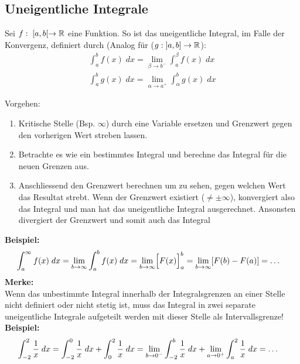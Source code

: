 \subsection{Uneigentliche Integrale}
\begin{definition} Sei $f: \; [a, b[ \to \mathbb{R}$ eine Funktion. So ist das uneigentliche Integral, im Falle der Konvergenz, definiert durch (Analog für ($g: \; ]a, b] \to \mathbb{R}$):\\
\begin{align*}
	\int_a^b f(x) \; dx = \lim_{\beta \to b^-} \int_a^{\beta} f(x)\; dx\\
	\int_a^b g(x) \; dx = \lim_{\alpha \to a^+} \int_{\alpha}^{b} g(x)\; dx
\end{align*}
\end{definition}

Vorgehen:
\begin{enumerate}
	\item Kritische Stelle (Bsp. $\infty$) durch eine Variable ersetzen und Grenzwert gegen den vorherigen Wert streben lassen.

	\item Betrachte es wie ein bestimmtes Integral und berechne das Integral für die neuen Grenzen aus. 

	\item Anschliessend den Grenzwert berechnen um zu sehen, gegen welchen Wert das Resultat strebt. Wenn der Grenzwert existiert ($\neq \pm \infty$), konvergiert also das Integral und man hat das uneigentliche Integral ausgerechnet. Ansonsten divergiert der Grenzwert und somit auch das Integral
\end{enumerate}
{\small
\hspace{-0.35cm}
\textbf{Beispiel:}
\vspace{-0.2cm}
\begin{align*}
	\hspace{-0.35cm} \int_{a}^{\infty} f(x) \; dx = \lim_{b \to \infty} \int_a^b f(x) \; dx = \lim_{b \to \infty} \Bigl[ F(x) \Bigr]_a^b = \lim_{b \to \infty} [F(b) - F(a)] = \dots
\end{align*}}\textbf{Merke:} \\
Wenn das unbestimmte Integral innerhalb der Integralsgrenzen an einer Stelle nicht definiert oder nicht stetig ist, muss das Integral in zwei separate uneigentliche Integrale aufgeteilt werden mit dieser Stelle als Intervallsgrenze! \\

{\small
\hspace{-0.35cm}
\textbf{Beispiel:}
\vspace{-0.2cm}
\begin{align*}
	\hspace{-0.35cm} \int_{-2}^{2} \frac{1}{x} \; dx = \int_{-2}^{0} \frac{1}{x} \; dx + \int_{0}^{2} \frac{1}{x} \; dx = \lim_{b \to 0^-} \int_{-2}^{b} \frac{1}{x} \; dx + \lim_{a \to 0^+} \int_{a}^{2} \frac{1}{x} \; dx = \dots
\end{align*}}



